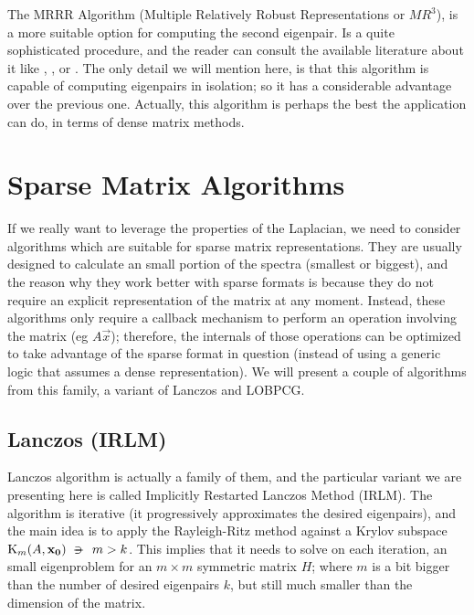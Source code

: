 The \gls{MRRR} Algorithm (Multiple Relatively Robust Representations or
$MR^3$), is a more suitable option for computing the second
eigenpair. Is a quite sophisticated procedure, and the reader
can consult the available literature about it like \cite{dhillon97},
\cite{dhillon04}, \cite{dhillon06} or \cite{parlett04}. The only
detail we will mention here, is that this algorithm is capable of
computing eigenpairs in isolation; so it has a considerable advantage
over the previous one. Actually, this algorithm is perhaps the best
the application can do, in terms of dense matrix methods.


\section{Sparse Matrix Algorithms}

If we really want to leverage the properties of the \gls{Laplacian}, we need
to consider algorithms which are suitable for sparse matrix
representations. They are usually designed to calculate an small
portion of the spectra (smallest or biggest), and the reason why they
work better with sparse formats is because they do not require
an explicit representation of the matrix at any moment. Instead, these
algorithms only require a callback mechanism to perform an operation
involving the matrix (eg $A\vec{x}$); therefore, the internals of
those operations can be optimized to take advantage of the sparse
format in question (instead of using a generic logic that assumes a
dense representation). We will present a couple of algorithms from
this family, a variant of Lanczos and LOBPCG.

\subsection{Lanczos (\gls{IRLM})}

Lanczos algorithm is actually a family of them, and the particular
variant we are presenting here is called Implicitly Restarted Lanczos
Method (\gls{IRLM}). The algorithm is iterative (it progressively approximates the
desired eigenpairs), and the main idea is to apply the Rayleigh-Ritz
method against a Krylov subspace $\Krylov{A}{\vec{x_0}}{m} \suchthat m
> k$. This implies that it needs to solve on each iteration, an small
eigenproblem for an $m \times m$ symmetric matrix $H$; where $m$ is a bit bigger
than the number of desired eigenpairs $k$, but still much smaller than the
dimension of the matrix. \\

